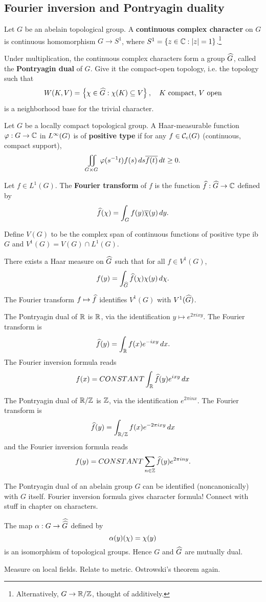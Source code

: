 \subsection{Fourier inversion and Pontryagin duality}
\begin{df}
Let $G$ be an abelain topological group. 
A \textbf{continuous complex character} on $G$ is continuous homomorphism $G\to S^1$, where $S^1=\set{z\in \C}{|z|=1}$.\footnote{Alternatively, $G\to \R/\Z$, thought of additively.}

Under multiplication, the continuous complex characters form a group $\wh{G}$, called the \textbf{Pontryagin dual} of $G$. Give it the compact-open topology, i.e. the topology such that 
\[
W(K,V)=\set{\chi\in \wh{G}}{\chi(K)\subeq V}, \quad K\text{ compact, }V\text{ open}
\]
is a neighborhood base for the trivial character.
\end{df}
\begin{df}
Let $G$ be a locally compact topological group. A Haar-measurable function $\ph:G\to \C$ in $L^{\iy}(G)$ is of \textbf{positive type} if for any $f\in \cal C_c(G)$ (continuous, compact support),
\[
\iint_{G\times G} \ph(s^{-1}t)f(s)\,ds \ol{f(t)} \,dt\ge 0.
\]
\end{df}
\begin{df}
Let $f\in L^1(G)$. The \textbf{Fourier transform} of $f$ is the function $\wh f:\wh G\to \C$ defined by
\[
\wh f(\chi)=\int_G f(y)\ol{\chi}(y)\,dy.
\]
\end{df}
\begin{df}
Define $V(G)$ to be the complex span of continuous functions of positive type ib $G$ and $V^1(G)=V(G)\cap L^1(G)$.
\end{df}
\begin{thm}
There exists a Haar measure on $\wh G$ such that for all $f\in V^1(G)$, 
\[
f(y)=\int_{\wh G} \wh f(\chi)\chi(y)\,d\chi.
\]
\end{thm}
The Fourier transform $f\mapsto \wh f$ identifies $V^1(G)$ with $V^1(\wh G)$.
\begin{ex}
The Pontryagin dual of $\R$ is $\R$, via the identification $y\mapsto e^{2\pi ixy}$. The Fourier transform is
\[
\wh f(y)=\int_{\R} f(x)e^{-ixy}\,dx.
\]
The Fourier inversion formula reads
\[
f(x)=CONSTANT\int_{\R}\wh f(y)e^{ixy}\,dx
\]

The Pontryagin dual of $\R/\Z$ is $\Z$, via the identification $e^{2\pi inx}$. The Fourier transform is 
\[
\wh f(y)=\int_{\R/\Z} f(x)e^{-2\pi ixy}\,dx
\]
and the Fourier inversion formula reads
\[
f(y)=CONSTANT\sum_{n\in \Z} \wh f(y)e^{2\pi iny}.
\]

The Pontryagin dual of an abelain group $G$ can be identified (noncanonically) with $G$ itself. Fourier inversion formula gives character formula! Connect with stuff in chapter on characters.
\end{ex}
\begin{thm}
The map $\al:G\to \wh{\wh{G}}$ defined by
\[
\al(y)(\chi)=\chi(y)
\]
is an isomorphism of topological groups. Hence $G$ and $\wh G$ are mutually dual.
\end{thm}
Measure on local fields. Relate to metric. Ostrowski's theorem again.

